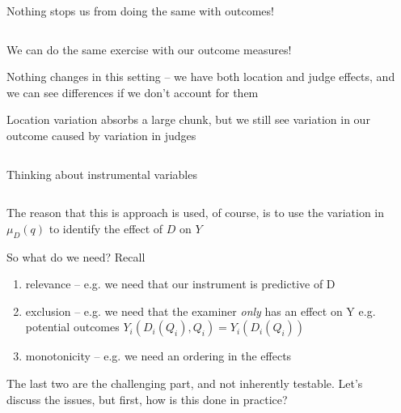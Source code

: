 \documentclass[notes,11pt, aspectratio=169]{beamer}
\newenvironment{wideitemize}{\itemize\addtolength{\itemsep}{10pt}}{\enditemize}
\begin{document}
\begin{frame}{Nothing stops us from doing the same with outcomes!}
    \begin{columns}[onlytextwidth, T] %
      \begin{column}{.5\textwidth}
        \begin{wideitemize}
        \item We can do the same exercise with our outcome measures!
        \item Nothing changes in this setting -- we have both location
          and judge effects, and we can see differences if we don't
          account for them
        \item Location variation absorbs a large chunk, but we still
          see variation in our outcome caused by variation in judges
        \end{wideitemize}
      \end{column}%
      \hfill%
      \begin{column}{.5\textwidth}
      \end{column}%
    \end{columns}
\end{frame}

\begin{frame}{Thinking about instrumental variables}
  \begin{columns}[onlytextwidth, T] %
    \begin{column}{.7\textwidth}
      \begin{wideitemize}
      \item The reason that this is approach is used, of course, is to
        use the variation in $\mu_{D}(q)$ to identify the effect of
        $D$ on $Y$
      \item   So what do we need? Recall
        \begin{enumerate}
          \item  relevance -- e.g. we need that our instrument is predictive of D
          \item exclusion -- e.g. we need that the examiner
            \emph{only} has an effect on Y e.g. potential outcomes
            $Y_{i}(D_{i}(Q_{i}), Q_{i}) = Y_{i}(D_{i}(Q_{i}))$
          \item monotonicity -- e.g. we need an ordering in the effects
          \end{enumerate}
        \item The last two are the challenging part, and not
          inherently testable. Let's discuss the issues, but first,
          how is this done in practice?
      \end{wideitemize}
    \end{column}%
    \hfill%
    \begin{column}{.5\textwidth}
    \end{column}%
  \end{columns}
\end{frame}
\end{document}
